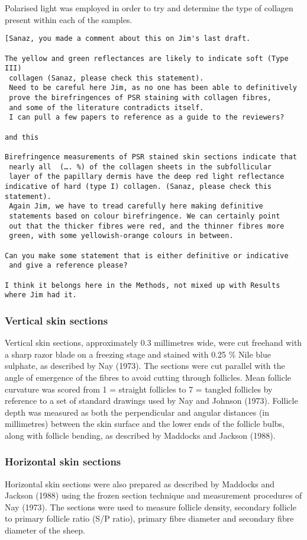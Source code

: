 \documentclass[titlepage]{article}  %
\begin{document}
Polarised light was employed in order to try and determine the type of
collagen present within each of the samples.
\begin{verbatim}
[Sanaz, you made a comment about this on Jim's last draft.

The yellow and green reflectances are likely to indicate soft (Type III)
 collagen (Sanaz, please check this statement).
 Need to be careful here Jim, as no one has been able to definitively 
 prove the birefringences of PSR staining with collagen fibres,
 and some of the literature contradicts itself.
 I can pull a few papers to reference as a guide to the reviewers?

and this

Birefringence measurements of PSR stained skin sections indicate that
 nearly all  (…. %) of the collagen sheets in the subfollicular
 layer of the papillary dermis have the deep red light reflectance 
indicative of hard (type I) collagen. (Sanaz, please check this statement).
 Again Jim, we have to tread carefully here making definitive
 statements based on colour birefringence. We can certainly point
 out that the thicker fibres were red, and the thinner fibres more
 green, with some yellowish-orange colours in between.

Can you make some statement that is either definitive or indicative
 and give a reference please?

I think it belongs here in the Methods, not mixed up with Results where Jim had it.
\end{verbatim}

\subsubsection{Vertical skin sections}
Vertical skin sections, approximately 0.3 millimetres wide, were cut
freehand with a sharp razor blade on a freezing stage and stained with
0.25 \% Nile blue sulphate, as described by Nay (1973).
The sections were cut parallel with the angle of
emergence of the fibres to avoid cutting through follicles. Mean
follicle curvature was scored from 1 = straight follicles to 7 =
tangled follicles by reference to a set of standard drawings used by
Nay and Johnson (1973). Follicle depth was measured
as both the perpendicular and angular distances (in millimetres)
between the skin surface and the lower ends of the follicle bulbs,
along with follicle bending, as described by Maddocks and Jackson
(1988).


\subsubsection{Horizontal skin sections}
Horizontal skin sections were also prepared as described by
Maddocks and Jackson (1988) using the frozen section technique and
measurement procedures of Nay (1973). The sections were used to measure
follicle density, secondary follicle to primary follicle ratio (S/P
ratio), primary fibre diameter and secondary fibre diameter of the
sheep.
\end{document}
